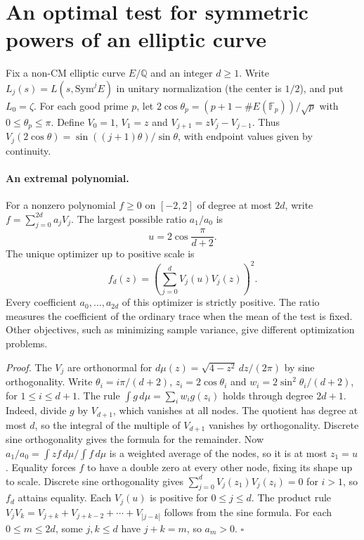 \section{An optimal test for symmetric powers of an elliptic curve}
\label{sec:sym}
Fix a non-CM elliptic curve $E/\mathbb Q$ and an integer $d\ge1$.
Write $L_j(s)=L(s,\mathrm{Sym}^j E)$ in unitary normalization
(the center is $1/2$), and put $L_0=\zeta$.
For each good prime $p$, let $2\cos\theta_p=(p+1-\#E(\mathbb F_p))/\sqrt p$
with $0\le\theta_p\le\pi$. Define $V_0=1$, $V_1=z$ and
$V_{j+1}=zV_j-V_{j-1}$. Thus $V_j(2\cos\theta)=
\sin((j+1)\theta)/\sin\theta$, with endpoint values given by continuity.

\paragraph{An extremal polynomial.}
For a nonzero polynomial $f\ge0$ on $[-2,2]$ of degree at most $2d$,
write $f=\sum_{j=0}^{2d} a_j V_j$. The largest possible ratio $a_1/a_0$ is
\[
 u=2\cos\frac{\pi}{d+2}.
\]
The unique optimizer up to positive scale is
\[
 f_d(z)=\left(\sum_{j=0}^d V_j(u)V_j(z)\right)^2 .
\]
Every coefficient $a_0,\ldots,a_{2d}$ of this optimizer is strictly positive.
The ratio measures the coefficient of the ordinary trace when the mean
of the test is fixed. Other objectives, such as minimizing sample variance,
give different optimization problems.

\emph{Proof.}
The $V_j$ are orthonormal for
$d\mu(z)=\sqrt{4-z^2}\,dz/(2\pi)$ by sine orthogonality.
Write $\theta_i=i\pi/(d+2)$, $z_i=2\cos\theta_i$ and
$w_i=2\sin^2\theta_i/(d+2)$, for $1\le i\le d+1$.
The rule $\int g\,d\mu=\sum_i w_i g(z_i)$ holds through degree $2d+1$.
Indeed, divide $g$ by $V_{d+1}$, which vanishes at all nodes. The quotient
has degree at most $d$, so the integral of the multiple of $V_{d+1}$
vanishes by orthogonality. Discrete sine orthogonality gives the formula for
the remainder. Now $a_1/a_0=\int zf\,d\mu/\int f\,d\mu$ is a weighted
average of the nodes, so it is at most $z_1=u$.
Equality forces $f$ to have a double zero at every other node, fixing its
shape up to scale. Discrete sine orthogonality gives
$\sum_{j=0}^d V_j(z_1)V_j(z_i)=0$ for $i>1$, so $f_d$ attains equality.
Each $V_j(u)$ is positive for $0\le j\le d$. The product rule
$V_j V_k=V_{j+k}+V_{j+k-2}+\cdots+V_{|j-k|}$ follows from the sine formula.
For each $0\le m\le2d$, some $j,k\le d$ have $j+k=m$, so $a_m>0$.
\hfill$\square$

